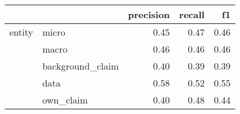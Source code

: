 \begin{tabular}{llrrr}
\toprule
       &           &  precision &  recall &   f1 \\
\midrule
entity & micro &       0.45 &    0.47 & 0.46 \\
       & macro &       0.46 &    0.46 & 0.46 \\
       & background\_claim &       0.40 &    0.39 & 0.39 \\
       & data &       0.58 &    0.52 & 0.55 \\
       & own\_claim &       0.40 &    0.48 & 0.44 \\
\bottomrule
\end{tabular}
